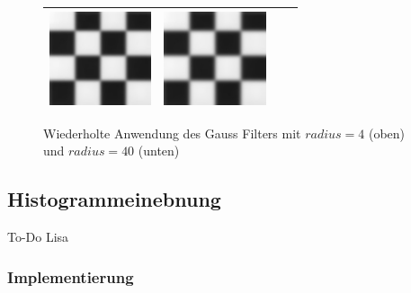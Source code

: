 \documentclass[12pt,german]{article}
\begin{document}
\begin{figure} [H]
\begin{tabular}{| c | c | c | c |}
	\includegraphics[width=3cm]{../testData/Gauss/SchachbrettR40S4v3.jpg} & 	
	\includegraphics[width=3cm]{../testData/Gauss/SchachbrettR40S4v4.jpg} \\
	\hline
  \end{tabular}
  \caption{Wiederholte Anwendung des Gauss Filters mit $ radius = 4 $ (oben) und $radius = 40 $ (unten)}
  \label{tab:wiederholterGauss}
\end{figure}

\newpage
\subsection{Histogrammeinebnung  }
To-Do Lisa
\subsubsection{Implementierung}


\end{document}
